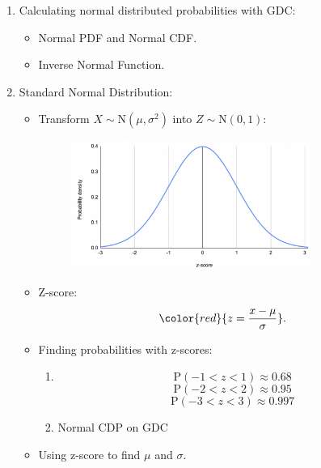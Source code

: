 \documentclass[12pt, a4paper]{article}
\newtheorem{definition}{Definition}[subsection]
\def\d{{\mathrm{d}}}
\def\P{\mathrm{P}}
\begin{document}
\begin{enumerate}
\begin{itemize}
\begin{enumerate}
            \item \begin{definition} For $X\sim\mathrm{N}(\mu,\sigma^2)$, 
            $${\color{red}{f(x)=\frac{1}{\sigma\sqrt{2\pi}}e^{-\frac{1}{2}\left(\frac{x-\mu}{\sigma}\right)^2},\text{ where }-\infty<x<\infty}}.$$
            $$\int_{-\infty}^\infty f(x) \d x=\int_{-\infty}^\infty \frac{1}{\sigma\sqrt{2\pi}}e^{-\frac{1}{2}\left(\frac{x-\mu}{\sigma}\right)^2}\d x=1.$$
            \end{definition}
        \end{enumerate}
    \end{itemize}
    \item Calculating normal distributed probabilities with GDC: 
    \begin{itemize}
        \item Normal PDF and Normal CDF.
        \item Inverse Normal Function.
    \end{itemize}
    \item Standard Normal Distribution: 
    \begin{itemize}
        \item Transform $X\sim\mathrm{N}(\mu,\sigma^2)$ into $Z\sim\mathrm{N}(0,1)$: 
        \begin{figure}[H]
            \center
            \includegraphics[width=0.8\textwidth]{Fig.4.7.jpg}
        \end{figure}
        \item Z-score: $${\color{red}{z=\frac{x-\mu}{\sigma}}}.$$
        \item Finding probabilities with z-scores: 
        \begin{enumerate}
            \item $$\P(-1<z<1)\approx 0.68$$
            $$\P(-2<z<2)\approx 0.95$$
            $$\P(-3<z<3)\approx 0.997$$
            \item Normal CDP on GDC
        \end{enumerate}
        \item Using z-score to find $\mu$ and $\sigma$.
    \end{itemize}
\end{enumerate}
\end{document}
